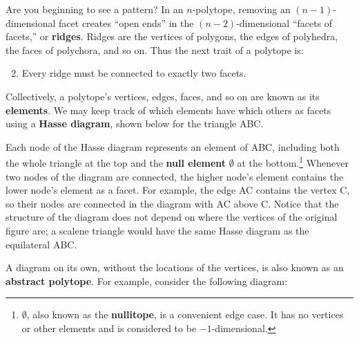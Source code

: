 \documentclass{article}
\begin{document}
Are you beginning to see a pattern?
In an $n$-polytope, removing an $(n-1)$-dimensional facet
creates ``open ends'' in the $(n-2)$-dimensional ``facets of facets,'' or \textbf{ridges}.
Ridges are the vertices of polygons, the edges of polyhedra, the faces of polychora, and so on.
Thus the next trait of a polytope is:
\begin{enumerate}
  \setcounter{enumi}{1}
  \item Every ridge must be connected to exactly two facets.
\end{enumerate}
Collectively, a polytope's vertices, edges, faces,
and so on are known as its \textbf{elements}.
We may keep track of which elements have which others as facets using a \textbf{Hasse diagram},
shown below for the triangle ABC.

\begin{center}
\end{center}

Each node of the Hasse diagram represents an element of ABC,
including both the whole triangle at the top
and the \textbf{null element} $\emptyset$ at the bottom.\footnote{
  $\emptyset$, also known as the \textbf{nullitope}, is a convenient edge case.
  It has no vertices or other elements and is considered to be $-1$-dimensional.
}
Whenever two nodes of the diagram are connected,
the higher node's element contains the lower node's element as a facet.
For example, the edge AC contains the vertex C,
so their nodes are connected in the diagram with AC above C.
Notice that the structure of the diagram does not depend on
where the vertices of the original figure are;
a scalene triangle would have the same Hasse diagram as the equilateral ABC.

A diagram on its own, without the locations of the vertices,
is also known as an \textbf{abstract polytope}.
For example, consider the following diagram:

\begin{center}
\end{center}
\end{document}
